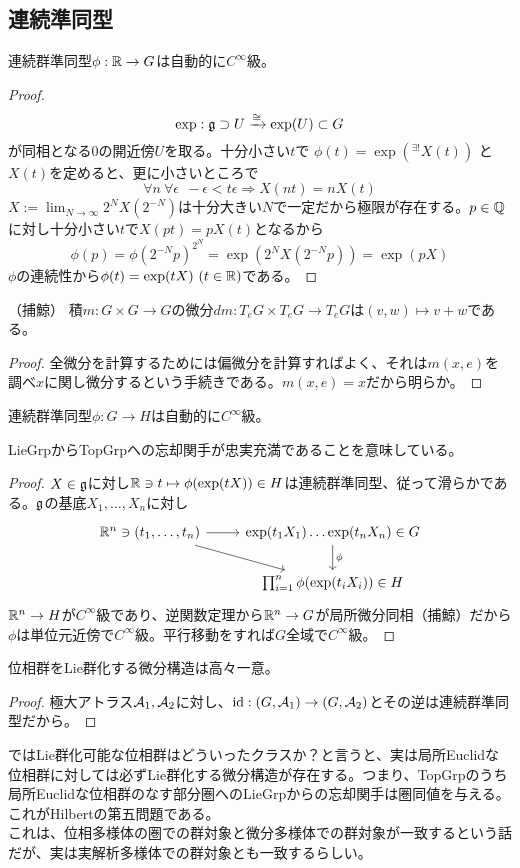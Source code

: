\subsection{連続準同型}
\begin{lem}
    連続群準同型$\phi:\mathbb{R}\to G$は自動的に$C^\infty$級。
\end{lem}
\begin{proof}
    \[\exp:\mathfrak{g}\supset U\xrightarrow{\cong}\exp(U)\subset G\]
    が同相となる$0$の開近傍$U$を取る。十分小さい$t$で $\phi(t)=\exp({}^{\exists !} X(t))$ と$X(t)$を定めると、更に小さいところで
    \[\forall n\ \forall\epsilon\ \ -\epsilon<t\epsilon\Rightarrow X(nt)=nX(t)\]
    $X:=\lim_{N\to\infty}2^NX(2^{-N})$は十分大きい$N$で一定だから極限が存在する。$p\in\mathbb{Q}$に対し十分小さい$t$で$X(pt)=pX(t)$となるから
    \[\phi(p)=\phi(2^{-N}p)^{2^N}=\exp(2^NX(2^{-N}p))=\exp(pX)\]
    $\phi$の連続性から$\phi(t)=\exp(tX)\ (t\in\mathbb{R})$である。
\end{proof}
\begin{lem}（捕鯨）
    積$m:G\times G\to G$の微分$dm:T_eG\times T_eG\to T_eG$は$(v,w)\mapsto v+w$である。
\end{lem}
\begin{proof}
    全微分を計算するためには偏微分を計算すればよく、それは$m(x,e)$を調べ$x$に関し微分するという手続きである。$m(x,e)=x$だから明らか。
\end{proof}
\begin{thm}
    連続群準同型$\phi:G\to H$は自動的に$C^\infty$級。
\end{thm}
LieGrpからTopGrpへの忘却関手が忠実充満であることを意味している。
\begin{proof}
    $X\in\mathfrak{g}$に対し$\mathbb{R}\ni t\mapsto\phi(\exp(tX))\in H$は連続群準同型、従って滑らかである。$\mathfrak{g}$の基底$X_1,\dots,X_n$に対し
    \[\begin{tikzcd}
        \R^n\ni(t_1,\dots,t_n)\arrow[r]\arrow[dr] &\exp(t_1X_1)\dots\exp(t_nX_n)\in G\arrow[d,"\phi"]\\
        &\prod_{i=1}^n\phi(\exp(t_iX_i))\in H
    \end{tikzcd}\]
    $\mathbb{R}^n\to H$が$C^\infty$級であり、逆関数定理から$\mathbb{R}^n\to G$が局所微分同相（捕鯨）だから$\phi$は単位元近傍で$C^\infty$級。平行移動をすれば$G$全域で$C^\infty$級。
\end{proof}
\begin{cor}
    位相群をLie群化する微分構造は高々一意。
\end{cor}
\begin{proof}
    極大アトラス$\mathcal{A}_1,\mathcal{A}_2$に対し、$\mathrm{id}:(G,\mathcal{A}_1)\to(G,\mathcal{A}_2)$とその逆は連続群準同型だから。
\end{proof}
ではLie群化可能な位相群はどういったクラスか？と言うと、実は局所Euclidな位相群に対しては必ずLie群化する微分構造が存在する。つまり、TopGrpのうち局所Euclidな位相群のなす部分圏へのLieGrpからの忘却関手は圏同値を与える。これがHilbertの第五問題である。\\
これは、位相多様体の圏での群対象と微分多様体での群対象が一致するという話だが、実は実解析多様体での群対象とも一致するらしい。


